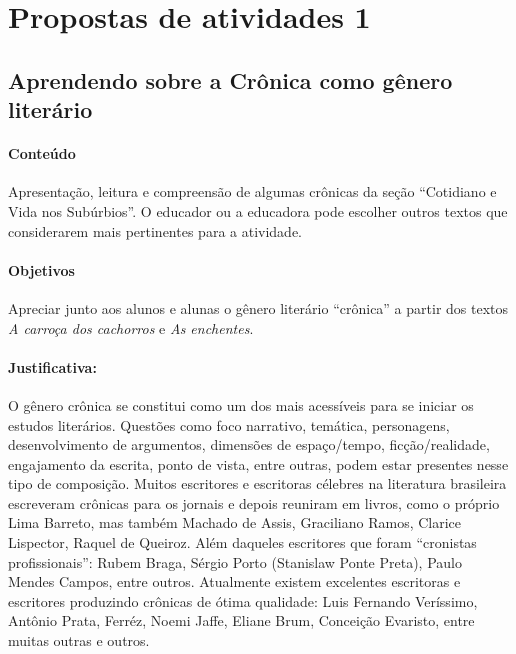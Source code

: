 \documentclass{extarticle}
\begin{document}
\section{Propostas de atividades 1}


\subsection{Aprendendo sobre a Crônica como gênero literário}


\paragraph{Conteúdo} Apresentação, leitura e compreensão de algumas
crônicas da seção ``Cotidiano e Vida nos Subúrbios''. O educador ou a
educadora pode escolher outros textos que considerarem mais pertinentes
para a atividade.


\paragraph{Objetivos} Apreciar junto aos alunos e alunas o gênero
literário ``crônica'' a partir dos textos {\textit{A carroça dos
cachorros}} e {\textit{As enchentes}.}







\paragraph{Justificativa:} O gênero crônica se constitui como um dos mais
acessíveis para se iniciar os estudos literários. Questões como foco
narrativo, temática, personagens, desenvolvimento de argumentos,
dimensões de espaço/tempo, ficção/realidade, engajamento da escrita,
ponto de vista, entre outras, podem estar presentes nesse tipo de
composição. Muitos escritores e escritoras célebres na literatura
brasileira escreveram crônicas para os jornais e depois reuniram em
livros, como o próprio Lima Barreto, mas também Machado de Assis,
Graciliano Ramos, Clarice Lispector, Raquel de Queiroz. Além daqueles
escritores que foram ``cronistas profissionais'': Rubem Braga, Sérgio
Porto (Stanislaw Ponte Preta), Paulo Mendes Campos, entre outros.
Atualmente existem excelentes escritoras e escritores produzindo
crônicas de ótima qualidade: Luis Fernando Veríssimo, Antônio Prata,
Ferréz, Noemi Jaffe, Eliane Brum, Conceição Evaristo, entre muitas
outras e outros.
\end{document}
